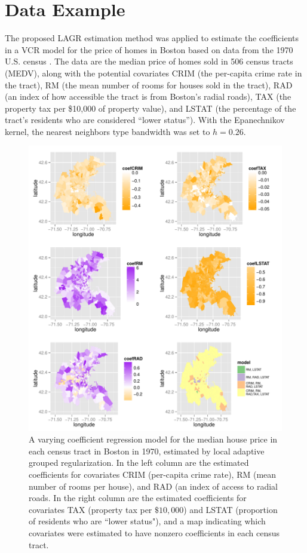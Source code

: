\documentclass[authoryear,review, 12pt]{elsarticle}
\newcommand{\maxwidth}{\textwidth}
\begin{document}
\section{Data Example\label{sec:example}}

The proposed LAGR estimation method was applied to estimate the coefficients
in a VCR model for the price of homes
in Boston based on data from the 1970 U.S. census \citep{Harrison-Rubinfeld-1978,Gilley-Pace-1996,Pace-Gilley-1997}.
The data are the median price of homes sold in 506 census tracts (MEDV),
along with the potential covariates CRIM (the per-capita crime rate
in the tract), RM (the mean number of rooms for houses sold in the
tract), RAD (an index of how accessible the tract is from Boston's
radial roads), TAX (the property tax per \$10,000 of property value),
and LSTAT (the percentage of the tract's residents who are considered
``lower status''). With the Epanechnikov kernel, the nearest neighbors type bandwidth
was set to $h=0.26$.


\begin{figure}

\includegraphics[width=\maxwidth]{figure/boston-plots} 
\caption{A varying coefficient regression model for the median house price in each census tract in Boston in 1970, estimated by local adaptive grouped regularization.
In the left column are the estimated coefficients for covariates CRIM (per-capita crime rate), RM (mean number of rooms per house), and RAD (an index of access to radial roads.
In the right column are the estimated coefficients for covariates TAX (property tax per $\$10,000$) and LSTAT (proportion of residents who are ``lower status"), and a map indicating which covariates were estimated to have nonzero coefficients in each census tract.
\label{fig:boston-lagr-coefs}}
\end{figure}
\end{document}
